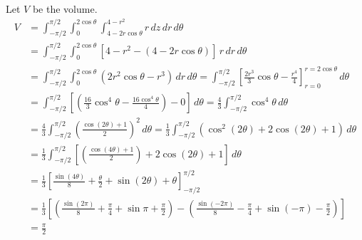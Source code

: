 \documentclass[a4paper, 12pt]{article}
\begin{document}
\begin{enumerate}[leftmargin=*,label=\textbf{\arabic*.}]
\begin{enumerate}[leftmargin=*,label=\textbf{\alph*.}]
\newpage

Let $V$ be the volume.
\begin{align*}
V&=\int_{-\pi/2}^{\pi/2}\int_{0}^{2\cos\theta}\int_{4-2r\cos\theta}^{4-r^2}r\,dz\,dr\,d\theta\\[1em]&=\int_{-\pi/2}^{\pi/2}\int_{0}^{2\cos\theta}\left[4-r^2-\left(4-2r\cos\theta\right)\right]\,r\,dr\,d\theta\\[1em]&=\int_{-\pi/2}^{\pi/2}\int_0^{2\cos\theta}(2r^2\cos\theta-r^3)\,dr\,d\theta=\int_{-\pi/2}^{\pi/2}\left[\frac{2r^3}3\cos\theta-\frac{r^4}4\right]_{r=0}^{r=2\cos\theta}\,d\theta\\[1em]&=\int_{-\pi/2}^{\pi/2}\left[\left(\frac{16}3\cos^4\theta-\frac{16\cos^4\theta}4\right) - 0\right]\,d\theta=\frac43\int_{-\pi/2}^{\pi/2}\cos^4\theta\,d\theta\\[1em]&=\frac43\int_{-\pi/2}^{\pi/2}\left(\frac{\cos(2\theta)+1}2\right)^2\,d\theta=\frac13\int_{-\pi/2}^{\pi/2}\left(\cos^2(2\theta)+2\cos(2\theta)+1\right)\,d\theta\\[1em]&=\frac13\int_{-\pi/2}^{\pi/2}\left[\left(\frac{\cos(4\theta)+1}2\right)+2\cos(2\theta)+1\right]\,d\theta\\[1em]&=\frac13\left[\frac{\sin(4\theta)}8+\frac\theta2+\sin(2\theta)+\theta\right]_{-\pi/2}^{\pi/2}\\[1em]&=\frac13\left[\left(\frac{\sin(2\pi)}8+\frac\pi4+\sin\pi+\frac\pi2\right)-\left(\frac{\sin\left(-2\pi\right)}8-\frac\pi4+\sin(-\pi)-\frac\pi2\right)\right]\\[1em]&=\boxed{\frac\pi2}
\end{align*}

\end{enumerate}
\end{enumerate}

\newpage
{}
{}


\end{document}
